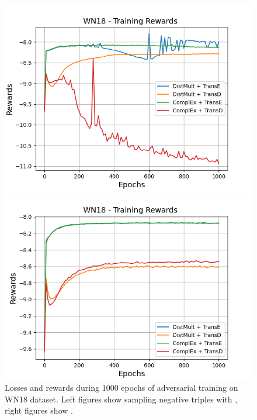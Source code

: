 \begin{figure}[H]
\begin{minipage}{.5\textwidth}
    \end{minipage}
    \begin{minipage}{.5\textwidth}
      \centering
      \includegraphics[width=0.9\linewidth]{figures/results/gan_train/not_pretrained/uncertainty/max/entropy/wn18/1k_epochs/uncertainty_wn18_rew.png}
    \end{minipage}%
    \begin{minipage}{.5\textwidth}
      \centering
      \includegraphics[width=0.9\linewidth]{figures/results/gan_train/not_pretrained/uncertainty/max_distribution/entropy/wn18/1k_epochs/uncertainty_wn18_rew.png}
    \end{minipage}%
    \caption{Losses and rewards during 1000 epochs of adversarial training on \textsc{WN18} dataset. 
    Left figures show sampling negative triples with \usmax, right figures show \ussoftmax.}
    \label{fig:advtrain_wn18_usmax_ussoftmax_losses_rewards}
\end{figure}

